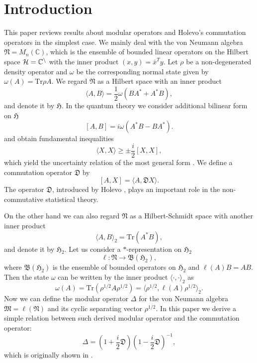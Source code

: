 \section{Introduction}
This paper reviews results about  modular operators \cite{Longo_1978} and  Holevo's commutation operators \cite{Holevo_1977} in the simplest case.
We mainly deal with the von Neumann algebra $\mathfrak{N}=M_n(\mathbb{C})$, 
which is the ensemble of bounded linear operators on 
the Hilbert space $\cal{H}=\mathbb{C}^n$ with the inner product $(x,y)=\bar{x}^Ty$. 
Let $\rho$ be a non-degenerated density operator and 
$\omega$ be the corresponding normal state given by $\omega(A)=\mbox{Tr}\rho A$.
We regard $\mathfrak{N}$ as a Hilbert space with an inner product
\begin{equation}
\label{innerP}
\langle A, B \rangle =\frac{1}{2}\omega(BA^{\ast}+A^{\ast}B),
\end{equation}
and denote it by $\mathfrak{H}$.
In the quantum theory we consider additional bilinear form on $\mathfrak{H}$ 
\begin{equation}\label{Bform}
[A,B]=i\omega(A^{\ast}B-BA^{\ast}).
\end{equation}
and  obtain fundamental inequalities 
$$
\langle X, X\rangle \geq \pm \frac{i}{2}[X,X],
$$
which yield  the uncertainty relation of the most general form \cite{Holevo_1977}.
We define a commutation operator $\mathfrak{D}$ by 
\begin{equation}\label{Copr}
[A,X]=\langle A, \mathfrak{D}X\rangle.
\end{equation}
The operator $\mathfrak{D}$, introduced by Holevo \cite{Holevo_1977}, plays an important role in the non-commutative statistical theory.  

On the other hand we can also regard $\mathfrak{N}$ as a Hilbert-Schmidt space with another inner product
$$
\langle A, B \rangle_2 =\mbox{Tr}(A^{\ast}B),
$$
and denote it by $\mathfrak{H}_2$.
Let us consider a $\ast$-representation on $\mathfrak{H}_2$
\begin{equation}\label{star-rep}
\ell :\mathfrak{N}\to \mathfrak{B}(\mathfrak{H}_2),
\end{equation}
where $\mathfrak{B}(\mathfrak{H}_2)$ is the ensemble of bounded operators on $\mathfrak{H}_2$
and $\ell(A)B=AB$.
Then the state $\omega$ can be written by the inner product $\langle \cdot, \cdot\rangle_2$ as 
$$
\omega(A)=\mbox{Tr}(\rho^{1/2}A\rho^{1/2})=\langle \rho^{1/2},\ell(A)\rho^{1/2}\rangle_2 .
$$
Now we can define the modular operator $\Delta$ for the von Neumann algebra $\mathfrak{M}=\ell(\mathfrak{N})$ and its cyclic separating vector $\rho^{1/2}$. 
In this paper we derive a simple relation between such derived modular operator and the commutation operator:
$$
    \Delta=\left(1+\frac{i}{2}\mathfrak{D}\right)\left(1-\frac{i}{2}\mathfrak{D}\right)^{-1},
$$
which is originally shown in \cite{Holevo_1977}.
